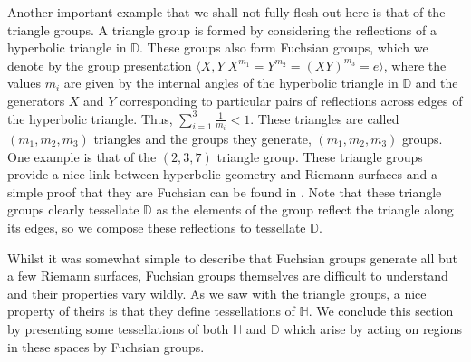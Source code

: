 \documentclass[11pt]{report}
\theoremstyle{definition}
\begin{document}
Another important example that we shall not fully flesh out here is that of the triangle groups. A triangle group is formed by considering the reflections of a hyperbolic triangle in $\mathbb{D}$. These groups also form Fuchsian groups, which we denote by the group presentation $\langle X,Y \vert X^{m_1}=Y^{m_2} = (XY)^{m_3} = e\rangle$, where the values $m_i$ are given by the internal angles of the hyperbolic triangle in $\mathbb{D}$ and the generators $X$ and $Y$ corresponding to particular pairs of reflections across edges of the hyperbolic triangle. Thus, $\sum\limits_{i=1}^3\frac{1}{m_i} < 1$. These triangles are called $(m_1,m_2,m_3)$ triangles and the groups they generate, $(m_1,m_2,m_3)$ groups. One example is that of the $(2,3,7)$ triangle group. These triangle groups provide a nice link between hyperbolic geometry and Riemann surfaces and a simple proof that they are Fuchsian can be found in \cite[p.237]{comfun}. Note that these triangle groups clearly tessellate $\mathbb{D}$ as the elements of the group reflect the triangle along its edges, so we compose these reflections to tessellate $\mathbb{D}$.

Whilst it was somewhat simple to describe that Fuchsian groups generate all but a few Riemann surfaces, Fuchsian groups themselves are difficult to understand and their properties vary wildly. As we saw with the triangle groups, a nice property of theirs is that they define tessellations of $\mathbb{H}$. We conclude this section by presenting some tessellations of both $\mathbb{H}$ and $\mathbb{D}$ which arise by acting on regions in these spaces by Fuchsian groups. 
\end{document}
